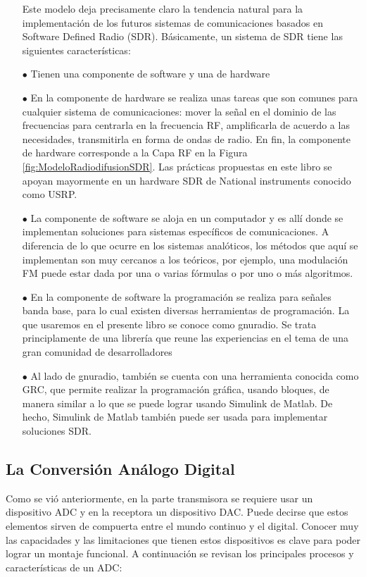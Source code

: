 \begin{itemize}
Este modelo deja precisamente claro la tendencia natural para la implementación de los futuros sistemas de comunicaciones basados en Software Defined Radio (SDR). Básicamente, un sistema de SDR tiene las siguientes características:

    \item [$\bullet$] Tienen una componente de software y una de hardware
    \item [$\bullet$] En la componente de hardware se realiza unas tareas que son comunes para cualquier sistema de comunicaciones: mover la señal en el dominio de las frecuencias para centrarla en la frecuencia RF, amplificarla de acuerdo a las necesidades, transmitirla en forma de ondas de radio. En fin, la componente de hardware corresponde a la Capa RF en la Figura \ref{fig:ModeloRadiodifusionSDR}. Las prácticas propuestas en este libro se apoyan mayormente en un hardware SDR de National instruments conocido como USRP.
    \item [$\bullet$] La componente de software se aloja en un computador y es allí donde se implementan soluciones para sistemas específicos de comunicaciones. A diferencia de lo que ocurre en los sistemas analóticos, los métodos que aquí se implementan son muy cercanos a los teóricos, por ejemplo, una modulación FM puede estar dada por una o varias fórmulas o por uno o más algoritmos. 
    \item [$\bullet$] En la componente de software la programación se realiza para señales banda base, para lo cual existen diversas herramientas de programación. La que usaremos en el presente libro se conoce como gnuradio. Se trata principlamente de una librería que reune las experiencias en el tema de una gran comunidad de desarrolladores
    \item [$\bullet$] Al lado de gnuradio, también se cuenta con una herramienta conocida como GRC, que permite realizar la programación gráfica, usando bloques, de manera similar a lo que se puede lograr usando Simulink de Matlab. De hecho, Simulink de Matlab también puede ser usada para implementar soluciones SDR.
\end{itemize}

\subsection{La Conversión Análogo Digital}
Como se vió anteriormente, en la parte transmisora se requiere usar un dispositivo ADC y en la receptora un dispositivo DAC. Puede decirse que estos elementos sirven de compuerta entre el mundo continuo y el digital. Conocer muy las capacidades y las limitaciones que tienen estos dispositivos es clave para poder lograr un montaje funcional. A continuación se revisan los principales procesos y características de un ADC:

